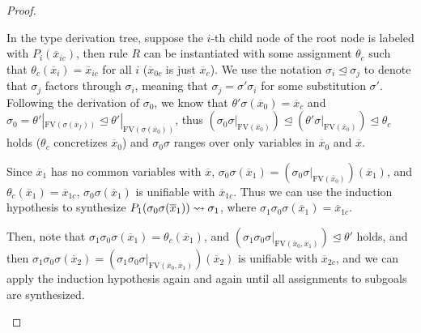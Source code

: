 \documentclass[manuscript,screen]{acmart}
\newcommand{\meta}[1]{
  \ensuremath{%
    #1
  }
}
\newcommand{\mvhzc}{\text{FV}}
\begin{document}
\begin{proof}
\begin{itemize}
    In the type derivation tree, suppose the $i$-th child node of the root node is labeled with $P_i(\overline{x}_{ic})$, then rule $R$ can be instantiated with some assignment $\theta_c$ such that $\theta_c(\overline{x}_i) = \overline{x}_{ic}$ for all $i$ ($\overline{x}_{0c}$ is just $\overline{x}_{c}$).
    We use the notation $\sigma_i \trianglelefteq \sigma_j$ to denote that $\sigma_j$ factors through $\sigma_i$, meaning that $\sigma_j = \sigma'\sigma_i$ for some substitution $\sigma'$.
    Following the derivation of $\sigma_0$, we know that $\theta'\sigma(\overline{x}_0) = \overline{x}_c$ and $\sigma_0 = \theta'|_{\mvhzc(\sigma(\overline{x}_f))}\trianglelefteq \theta'|_{\mvhzc(\sigma(\overline{x}_0))}$, thus $(\sigma_0\sigma|_{\mvhzc(\overline{x}_0)})\trianglelefteq (\theta'\sigma|_{\mvhzc(\overline{x}_0)}) \trianglelefteq \theta_c$ holds ($\theta_c$ concretizes $\overline{x}_0$) and $\sigma_0\sigma$ ranges over only variables in $\overline{x}_0$ and $\overline{x}$.

    Since $\overline{x}_1$ has no common variables with $\overline{x}$, $\sigma_0\sigma(\overline{x}_1)= (\sigma_0\sigma|_{\mvhzc(\overline{x}_0)})(\overline{x}_1)$, and $\theta_c(\overline{x}_1)=\overline{x}_{1c}$,   $\sigma_0\sigma(\overline{x}_1)$ is unifiable with $\overline{x}_{1c}$.
    Thus we can use the induction hypothesis to    {\color{revblue}synthesize } $P_1(\meta{\sigma_0\sigma(\overline{x}_1)}) \leadsto \sigma_1$, where $\sigma_1\sigma_0\sigma(\overline{x}_1) = \overline{x}_{1c}$.

       {\color{revblue}
    Then, note } that $\sigma_1\sigma_0\sigma(\overline{x}_1) = \theta_c(\overline{x}_1)$, and    {\color{revblue}$(\sigma_1\sigma_0\sigma|_{\mvhzc(\overline{x}_0,\overline{x}_1)}) \allowbreak\trianglelefteq \theta'$ } holds, and then    {\color{revblue}$\sigma_1\sigma_0\sigma(\overline{x}_2)=\allowbreak(\sigma_1\sigma_0\sigma|_{\mvhzc(\overline{x}_0,\overline{x}_1)})(\overline{x}_2)$ } is unifiable with $\overline{x}_{2c}$, and we can apply the induction hypothesis again and again until all assignments to subgoals are synthesized.


\end{itemize}
\end{proof}
\end{document}
